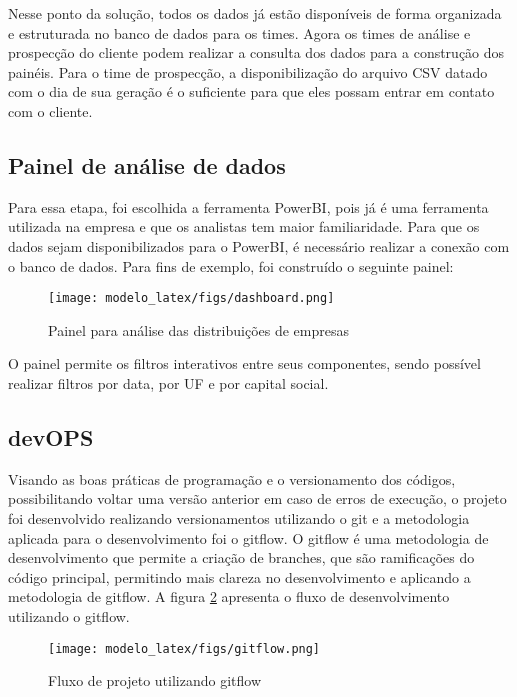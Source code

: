 Nesse ponto da solução, todos os dados já estão disponíveis de forma organizada e estruturada no banco de dados para os times. Agora os times de análise e prospecção do cliente podem realizar a consulta dos dados para a construção dos painéis. Para o time de prospecção, a disponibilização do arquivo CSV datado com o dia de sua geração é o suficiente para que eles possam entrar em contato com o cliente.

\subsection{Painel de análise de dados}

Para essa etapa, foi escolhida a ferramenta PowerBI, pois já é uma ferramenta utilizada na empresa e que os analistas tem maior familiaridade.
Para que os dados sejam disponibilizados para o PowerBI, é necessário realizar a conexão com o banco de dados. Para fins de exemplo, foi construído o seguinte painel:

\begin{figure}[H]
    \centering
    \texttt{[image: modelo\_latex/figs/dashboard.png]}
    \caption{Painel para análise das distribuições de empresas}
    \label{fig:dashboard}
\end{figure}

O painel permite os filtros interativos entre seus componentes, sendo possível realizar filtros por data, por UF e por capital social.

\subsection{devOPS}

Visando as boas práticas de programação e o versionamento dos códigos, possibilitando voltar uma versão anterior em caso de erros de execução, o projeto foi desenvolvido realizando versionamentos utilizando o git e a metodologia aplicada para o desenvolvimento foi o gitflow. O gitflow é uma metodologia de desenvolvimento que permite a criação de branches, que são ramificações do código principal, permitindo mais clareza no desenvolvimento e aplicando a metodologia de gitflow. A figura \ref{fig:gitflow} apresenta o fluxo de desenvolvimento utilizando o gitflow.

\begin{figure}[H]
    \centering
    \texttt{[image: modelo\_latex/figs/gitflow.png]}
    \caption{Fluxo de projeto utilizando gitflow}
    \label{fig:gitflow}
\end{figure}


